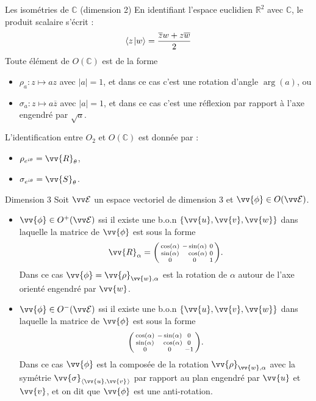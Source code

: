 \documentclass[bigger]{m53beamer}
\begin{document}
\begin{frame}{Les isométries de $\mathbb{C}$ (dimension 2)}
  En identifiant l'espace euclidien $\mathbb{R}^{2}$ avec $\mathbb{C}$, le produit scalaire s'écrit :
  \[
    \langle{z}\kern1pt |{w}\rangle = \frac{\overline{z}w+z\overline{w}}{2}
  \]\pause
  Toute élément de $O(\mathbb{C})$ est de la forme\pause
  \begin{itemize}[<.(1)->]
    \item $\rho_{a} : z \mapsto az$ avec $|a| =1$, et dans ce cas c'est une rotation d'angle $\arg(a)$\pause, ou
    \item $\sigma_{a} : z \mapsto a\overline{z}$ avec $|a| =1$, et dans ce cas c'est une réflexion par rapport à l'axe engendré par $\sqrt{a}$.
  \end{itemize}\pause
  L'identification entre $O_{2}$ et $O(\mathbb{C})$ est donnée par :
  \begin{itemize}[<+(1)->]
    \item $\rho_{e^{i\theta}}=\vv{R}_{\theta}$,
    \item $\sigma_{e^{i\theta}}=\vv{S}_{\theta}$.
  \end{itemize}
\end{frame}

\begin{frame}{Dimension 3}
  Soit $\ev{E}$ un espace vectoriel de dimension $3$ et $\vv{\phi} \in O(\ev{E})$.
  \begin{itemize}[<+(1)->]
    \item $\vv{\phi} \in O^{+}(\ev{E})$ ssi il existe une b.o.n $\{\vv{u},\vv{v},\vv{w}\}$ dans laquelle la matrice de $\vv{\phi}$ est sous la forme
    \[
      \vv{R}_{\alpha}=
        \begin{psmallmatrix}
          \cos(\alpha)&-\sin(\alpha)&0\\
          \sin(\alpha)&\phantom{-}\cos(\alpha)&0\\
          0&0&1
        \end{psmallmatrix}.
    \]\pause
    Dans ce cas $\vv{\phi} = \vv{\rho}_{\vv{w},\alpha}$ est la rotation de $\alpha$ autour de l'axe orienté engendré par $\vv{w}$.
    \item $\vv{\phi} \in O^{-}(\ev{E})$ ssi il existe une b.o.n $\{\vv{u},\vv{v},\vv{w}\}$ dans laquelle la matrice de $\vv{\phi}$ est sous la forme
    \[
      \begin{psmallmatrix}
        \cos(\alpha)&-\sin(\alpha)&0\\
        \sin(\alpha)&\phantom{-}\cos(\alpha)&0\\
        0&0&-1
      \end{psmallmatrix}.
    \]\pause
    Dans ce cas $\vv{\phi}$ est la composée de la rotation $\vv{\rho}_{\vv{w},\alpha}$ avec la symétrie $\vv{\sigma}_{\affspan{\vv{u},\vv{v}}}$ par rapport au plan engendré par $\vv{u}$ et $\vv{v}$, et on dit que $\vv{\phi}$ est une \alert{anti-rotation}.
  \end{itemize}
\end{frame}
\end{document}

